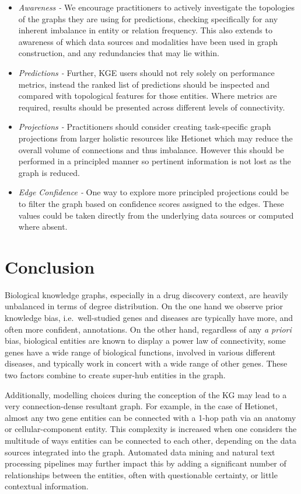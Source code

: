 \begin{itemize}
	\item \emph{Awareness -} We encourage practitioners to actively investigate the topologies of the graphs they are using for predictions, checking specifically for any inherent imbalance in entity or relation frequency. This also extends to awareness of which data sources and modalities have been used in graph construction, and any redundancies that may lie within.
	\item \emph{Predictions -} Further, KGE users should not rely solely on performance metrics, instead the ranked list of predictions should be inspected and compared with topological features for those entities. Where metrics are required, results should be presented across different levels of connectivity.
	\item \emph{Projections -} Practitioners should consider creating task-specific graph projections from larger holistic resources like Hetionet which may reduce the overall volume of connections and thus imbalance. However this should be performed in a principled manner so pertinent information is not lost as the graph is reduced.
	\item \emph{Edge Confidence -} One way to explore more principled projections could be to filter the graph based on confidence scores assigned to the edges. These values could be taken directly from the underlying data sources or computed where absent.
\end{itemize}\section{Conclusion}\label{sec:conclusion}

Biological knowledge graphs, especially in a drug discovery context, are heavily unbalanced in terms of degree distribution. On the one hand we observe prior knowledge bias, i.e.\ well-studied genes and diseases are typically have more, and often more confident, annotations. On the other hand, regardless of any \emph{a priori} bias, biological entities are known to display a power law of connectivity, some genes have a wide range of biological functions, involved in various different diseases, and typically work in concert with a wide range of other genes. These two factors combine to create super-hub entities in the graph.

Additionally, modelling choices during the conception of the KG may lead to a very connection-dense resultant graph. For example, in the case of Hetionet, almost any two gene entities can be connected with a 1-hop path via an anatomy or cellular-component entity. This complexity is increased when one considers the multitude of ways entities can be connected to each other, depending on the data sources integrated into the graph. Automated data mining and natural text processing pipelines may further impact this by adding a significant number of relationships between the entities, often with questionable certainty, or little contextual information.

